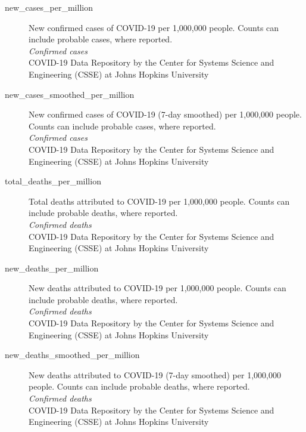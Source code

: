 \begin{description}
    \item[new\_cases\_per\_million] 
    New confirmed cases of COVID-19 per 1,000,000 people. Counts can include probable cases, where reported.\\
    \emph{\footnotesize{Confirmed cases}}\\
    \footnotesize{COVID-19 Data Repository by the Center for Systems Science and Engineering (CSSE) at Johns Hopkins University}\\

    \item[new\_cases\_smoothed\_per\_million] 
    New confirmed cases of COVID-19 (7-day smoothed) per 1,000,000 people. Counts can include probable cases, where reported.\\
    \emph{\footnotesize{Confirmed cases}}\\
    \footnotesize{COVID-19 Data Repository by the Center for Systems Science and Engineering (CSSE) at Johns Hopkins University}\\

    \item[total\_deaths\_per\_million] 
    Total deaths attributed to COVID-19 per 1,000,000 people. Counts can include probable deaths, where reported.\\
    \emph{\footnotesize{Confirmed deaths}}\\
    \footnotesize{COVID-19 Data Repository by the Center for Systems Science and Engineering (CSSE) at Johns Hopkins University}\\

    \item[new\_deaths\_per\_million] 
    New deaths attributed to COVID-19 per 1,000,000 people. Counts can include probable deaths, where reported.\\
    \emph{\footnotesize{Confirmed deaths}}\\
    \footnotesize{COVID-19 Data Repository by the Center for Systems Science and Engineering (CSSE) at Johns Hopkins University}\\

    \item[new\_deaths\_smoothed\_per\_million] 
    New deaths attributed to COVID-19 (7-day smoothed) per 1,000,000 people. Counts can include probable deaths, where reported.\\
    \emph{\footnotesize{Confirmed deaths}}\\
    \footnotesize{COVID-19 Data Repository by the Center for Systems Science and Engineering (CSSE) at Johns Hopkins University}\\


\end{description}
